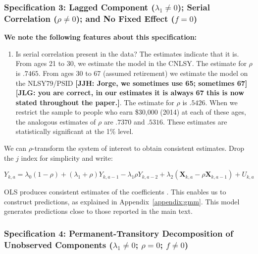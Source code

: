 \subsubsection{Specification 3: Lagged Component ($\lambda_{1} \neq 0$); Serial Correlation ($\rho \neq 0$); and No Fixed Effect ($f = 0$)} \label{section:laggedserial}

\noindent \textbf{We note the following features about this specification:}

\begin{enumerate}

\item Is serial correlation present in the data? The estimates indicate that it is. From ages 21 to 30, we estimate the model in the CNLSY. The estimate for $\rho$ is $.7465$. From ages 30 to 67 (assumed retirement) we estimate the model on the NLSY79/PSID \textbf{[JJH: Jorge, we sometimes use 65; sometimes 67] [JLG: you are correct, in our estimates it is always 67 this is now stated throughout the paper.]}. The estimate for $\rho$ is $.5426$. When we restrict the sample to people who earn \$30,000 (2014) at each of these ages, the analogous estimates of $\rho$ are $.7370$ and $.5316$. These estimates are statistically significant at the 1\% level.\\
\end{enumerate}

\noindent We can $\rho$-transform the system of interest to obtain consistent estimates. Drop the $j$ index for simplicity and write:

\begin{equation}
Y_{k,a} = \lambda_{0} \left( 1 - \rho \right) + \left( \lambda_{1} + \rho \right) Y_{k,a-1} - \lambda_{1} \rho Y_{k,a-2} + \lambda_{2} \left( \bm{X}_{k,a} - \rho \bm{X}_{k,a-1}  \right) + U_{k,a} \label{eq:rhotransform}
\end{equation}

\noindent OLS produces consistent estimates of the coefficients \label{eq:rhotransform}. This enables us to construct predictions, as explained in Appendix~\ref{appendix:gmm}. This model generates predictions close to those reported in the main text. \\

\subsubsection{Specification 4: Permanent-Transitory Decomposition of Unobserved Components ($\lambda_{1} \neq 0$; $\rho = 0$; $f \neq 0$)} \label{app:permtrans}

